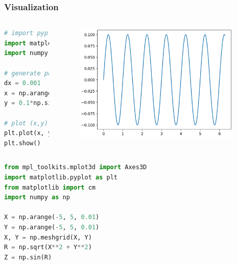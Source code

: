 \begin{frame}[fragile]
	\MyLogo
	\frametitle{Visualization}  
	\small

\vskip -12pt
\begin{columns}
\tiny{
\begin{lstlisting}[language=python]
# import pyplot module for visualization
import matplotlib.pyplot as plt
import numpy as np

# generate points (x,y)
dx = 0.001
x = np.arange(0, 2*np.pi, dx)
y = 0.1*np.sin(2*np.pi*x)

# plot (x,y) curve
plt.plot(x, y)
plt.show()	
\end{lstlisting}
}
%
\begin{figure}[htbp] 
   \includegraphics[width=0.95\textwidth]{figures/sin.png} 
\end{figure}
%
\end{columns}

\vskip -15pt
\begin{columns}
\tiny{
\begin{lstlisting}[language=python]
from mpl_toolkits.mplot3d import Axes3D
import matplotlib.pyplot as plt
from matplotlib import cm
import numpy as np

X = np.arange(-5, 5, 0.01)
Y = np.arange(-5, 5, 0.01)
X, Y = np.meshgrid(X, Y)
R = np.sqrt(X**2 + Y**2)
Z = np.sin(R)


\end{lstlisting}}
\end{columns}
\end{frame}
